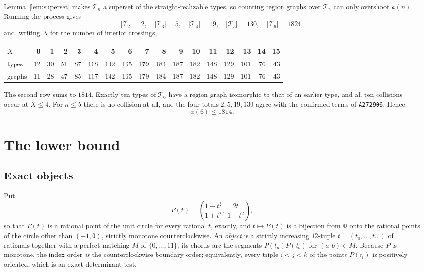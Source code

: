 \documentclass[11pt]{amsart}
\theoremstyle{definition}
\theoremstyle{remark}
\newcommand{\Tn}{\mathcal T}
\begin{document}
Lemma~\ref{lem:superset} makes $\Tn_n$ a superset of the straight-realizable types, so
counting region graphs over $\Tn_n$ can only overshoot $a(n)$. Running the process gives
\[
 |\Tn_2|=2,\quad |\Tn_3|=5,\quad |\Tn_4|=19,\quad |\Tn_5|=130,\quad
 |\Tn_6|=1824,
\]
and, writing $X$ for the number of interior crossings,

\medskip
\noindent
{\small\setlength{\tabcolsep}{2.6pt}
\begin{tabular}{l|*{16}{r}}
$X$ & 0 & 1 & 2 & 3 & 4 & 5 & 6 & 7 & 8 & 9 & 10 & 11 & 12 & 13 & 14 & 15\\
\hline
types & 12 & 30 & 51 & 87 & 108 & 142 & 165 & 179 & 184 & 187 & 182 & 148 &
129 & 101 & 76 & 43\\
graphs & 11 & 28 & 47 & 85 & 107 & 142 & 165 & 179 & 184 & 187 & 182 & 148 &
129 & 101 & 76 & 43
\end{tabular}}

\medskip
\noindent
The second row sums to $1814$. Exactly ten types of $\Tn_6$ have a region graph
isomorphic to that of an earlier type, and all ten collisions occur at $X\le4$. For
$n\le5$ there is no collision at all, and the four totals $2,5,19,130$ agree with the
confirmed terms of \texttt{A272906}. Hence
\begin{equation}\label{eq:upper}
 a(6)\le 1814 .
\end{equation}

\section{The lower bound}\label{sec:lower}

\subsection*{Exact objects} Put
\begin{equation}\label{eq:param}
 P(t)=\left(\frac{1-t^2}{1+t^2},\ \frac{2t}{1+t^2}\right),
\end{equation}
so that $P(t)$ is a rational point of the unit circle for every rational $t$, exactly, and
$t\mapsto P(t)$ is a bijection from $\mathbb Q$ onto the rational points of the circle
other than $(-1,0)$, strictly monotone counterclockwise. An \emph{object} is a strictly
increasing $12$-tuple $t=(t_0,\ldots,t_{11})$ of rationals together with a perfect
matching $M$ of $\{0,\ldots,11\}$; its chords are the segments $P(t_a)P(t_b)$ for
$(a,b)\in M$. Because $P$ is monotone, the index order \emph{is} the counterclockwise
boundary order; equivalently, every triple $i<j<k$ of the points $P(t_i)$ is positively
oriented, which is an exact determinant test.
\end{document}
